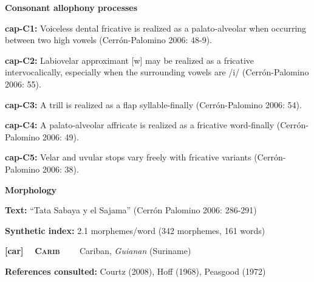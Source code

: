 \begin{styleBody}
\textbf{Consonant allophony processes}
\end{styleBody}

\begin{styleBody}
\textbf{cap-C1: }Voiceless dental fricative is realized as a palato-alveolar when occurring between two high vowels (Cerrón-Palomino 2006: 48-9).
\end{styleBody}

\begin{styleBody}
\textbf{cap-C2: }Labiovelar approximant [w] may be realized as a fricative intervocalically, especially when the surrounding vowels are /i/ (Cerrón-Palomino 2006: 55).
\end{styleBody}

\begin{styleBody}
\textbf{cap-C3: }A trill is realized as a flap syllable-finally (Cerrón-Palomino 2006: 54).
\end{styleBody}

\begin{styleBody}
\textbf{cap-C4: }A palato-alveolar affricate is realized as a fricative word-finally (Cerrón-Palomino 2006: 49).
\end{styleBody}

\begin{styleBody}
\textbf{cap-C5: }Velar and uvular stops vary freely with fricative variants (Cerrón-Palomino 2006: 38).
\end{styleBody}

\begin{styleBody}
\textbf{Morphology}
\end{styleBody}

\begin{styleBody}
\textbf{Text: }“Tata Sabaya y el Sajama” (Cerrón Palomino 2006: 286-291)
\end{styleBody}

\begin{styleBody}
\textbf{Synthetic index: }2.1 morphemes/word (342 morphemes, 161 words)
\end{styleBody}

\clearpage\begin{styleBody}
\textbf{[car] }\ \ \textbf{\textsc{Carib\ \ }}\textbf{\ \ }Cariban, \textit{Guianan} (Suriname)
\end{styleBody}

\begin{styleBody}
\textbf{References consulted: }Courtz (2008), Hoff (1968), Peasgood (1972)
\end{styleBody}

